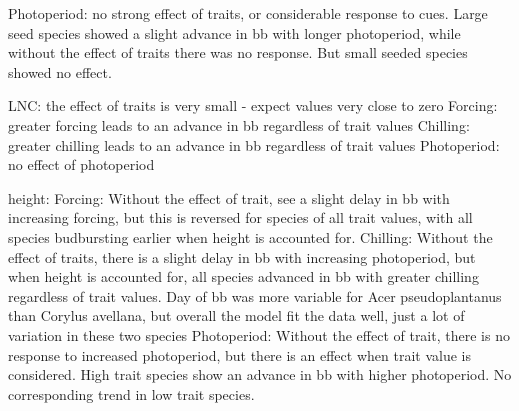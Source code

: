 \documentclass{article}\usepackage[]{graphicx}\usepackage[]{color}
\begin{document}
Photoperiod: no strong effect of traits, or considerable response to cues. Large seed species showed a slight advance in bb with longer photoperiod, while without the effect of traits there was no response. But small seeded species showed no effect.

LNC: the effect of traits is very small - expect values very close to zero
Forcing: greater forcing leads to an advance in bb regardless of trait values
Chilling: greater chilling leads to an advance in bb regardless of trait values
Photoperiod: no effect of photoperiod 

height:
Forcing: Without the effect of trait, see a slight delay in bb with increasing forcing, but this is reversed for species of all trait values, with all species budbursting earlier when height is accounted for.
Chilling: Without the effect of traits, there is a slight delay in bb with increasing photoperiod, but when height is accounted for, all species advanced in bb with greater chilling regardless of trait values. Day of bb was more variable for Acer pseudoplantanus than Corylus avellana, but overall the model fit the data well, just a lot of variation in these two species
Photoperiod: Without the effect of trait, there is no response to increased photoperiod, but there is an effect when trait value is considered. High trait species show an advance in bb with higher photoperiod. No corresponding trend in low trait species.
\end{document}
